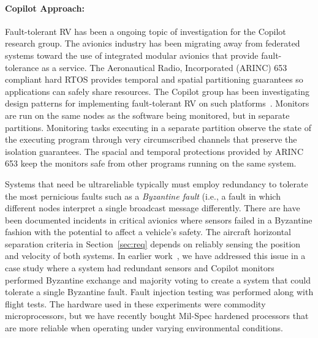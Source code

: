 \paragraph{Copilot Approach:} Fault-tolerant RV has been a ongoing
topic of investigation for the Copilot research group. The avionics
industry has been migrating away from federated systems toward the use
of integrated modular avionics that provide fault-tolerance as a
service.  The Aeronautical Radio, Incorporated (ARINC)
653~\cite{ARINC653} compliant hard  RTOS
provides temporal and spatial partitioning guarantees so applications
can safely share resources.  The Copilot group has been investigating
design patterns for implementing fault-tolerant RV on such
platforms~\cite{Kaveh15}. Monitors are run on the same nodes as the
software being monitored, but in separate partitions. Monitoring tasks
executing in a separate partition observe the state of the executing
program through very circumscribed
channels that preserve the isolation guarantees.  The spacial and
temporal protections provided by ARINC 653 keep the monitors safe from
other programs running on the same system.

Systems that need be ultrareliable typically must employ redundancy to
tolerate the most pernicious faults such as a \emph{Byzantine fault}
(i.e., a fault in which different nodes interpret a single broadcast
message differently.  There are have been  documented incidents in
critical avionics  where sensors failed in a Byzantine fashion with
the potential to affect a vehicle's safety.  The aircraft horizontal separation criteria in
Section~\ref{sec:req} depends on reliably sensing the position and
velocity of both systems. In earlier work~\cite{pike-isse-13}, we have
 addressed this issue in a case study where a system had
redundant sensors and Copilot monitors performed Byzantine exchange and 
majority voting to create a system that could tolerate a single
Byzantine fault.  Fault injection testing was
performed along with flight tests.  The hardware used in these
experiments were commodity microprocessors, but we have recently
bought Mil-Spec hardened processors that are more reliable when operating
under varying environmental conditions.




